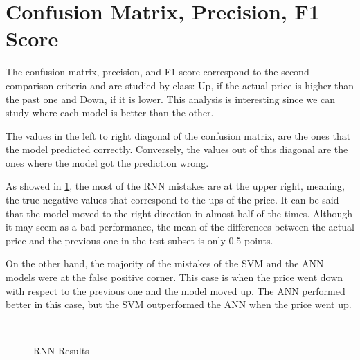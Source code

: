 \section{Confusion Matrix, Precision, F1 Score}

The confusion matrix, precision, and F1 score correspond to the second comparison criteria and are studied by class: Up, if the actual price is higher than the past one and Down, if it is lower. This analysis is interesting since we can study where each model is better than the other. 

The values in the left to right diagonal of the confusion matrix, are the ones that the model predicted correctly. Conversely, the values out of this diagonal are the ones where the model got the prediction wrong.

As showed in \ref{fig:resultsRNN}, the most of the RNN mistakes are at the upper right, meaning, the true negative values that correspond to the ups of the price. It can be said that the model moved to the right direction in almost half of the times. Although it may seem as a bad performance, the mean of the differences between the actual price and the previous one in the test subset is only 0.5 points. 

On the other hand, the majority of the mistakes of the SVM and the ANN models were at the false positive corner. This case is when the price went down with respect to the previous one and the model moved up. The ANN performed better in this case, but the SVM outperformed the ANN when the price went up.

\begin{figure}
\center
{} 
\\
\caption{RNN Results}
\label{fig:resultsRNN}
\end{figure}

